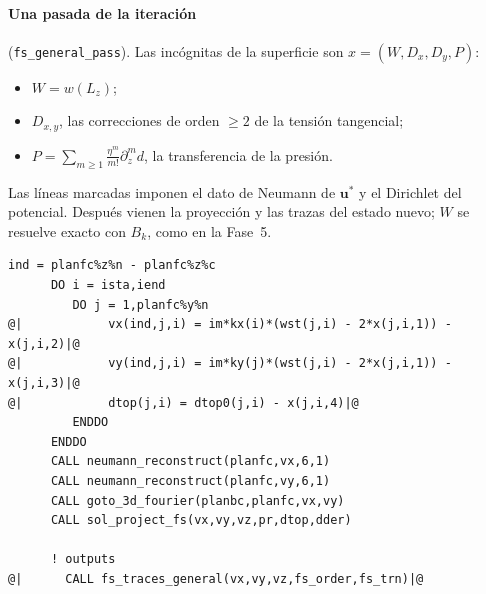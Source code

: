 \documentclass[11pt,a4paper]{article}
\begin{document}
\paragraph{Una pasada de la iteración} (\texttt{fs\_general\_pass}). Las incógnitas de la
superficie son $x=(W,D_x,D_y,P)$:
\begin{itemize}
\item $W=w(L_z)$;
\item $D_{x,y}$, las correcciones de orden $\ge2$ de la tensión tangencial;
\item $P=\sum_{m\ge1}\frac{\eta^m}{m!}\partial_z^m d$, la transferencia de la presión.
\end{itemize}
Las líneas marcadas imponen el dato de Neumann de $\mathbf u^*$ y el Dirichlet del potencial.
Después vienen la proyección y las trazas del estado nuevo; $W$ se resuelve exacto con $B_k$,
como en la Fase~5.
\begin{lstlisting}[style=f90,firstnumber=540]
      ind = planfc%z%n - planfc%z%c
      DO i = ista,iend
         DO j = 1,planfc%y%n
@|            vx(ind,j,i) = im*kx(i)*(wst(j,i) - 2*x(j,i,1)) - x(j,i,2)|@
@|            vy(ind,j,i) = im*ky(j)*(wst(j,i) - 2*x(j,i,1)) - x(j,i,3)|@
@|            dtop(j,i) = dtop0(j,i) - x(j,i,4)|@
         ENDDO
      ENDDO
      CALL neumann_reconstruct(planfc,vx,6,1)
      CALL neumann_reconstruct(planfc,vy,6,1)
      CALL goto_3d_fourier(planbc,planfc,vx,vy)
      CALL sol_project_fs(vx,vy,vz,pr,dtop,dder)

      ! outputs
@|      CALL fs_traces_general(vx,vy,vz,fs_order,fs_trn)|@
\end{lstlisting}
\end{document}
